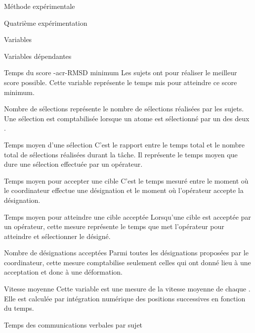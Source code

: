 \documentclass[myfrancais,ngerman,english,french]{mythesis}
\begin{document}
\begin{mychapter}{Méthode expérimentale}
\begin{mysection}{Quatrième expérimentation}
\begin{mysubsection}{Variables}
\begin{mysubsubsection}{Variables dépendantes}
\begin{myparagraph}{ Temps du score \myacronl-{acr-RMSD} minimum}
						Les sujets ont  pour réaliser le meilleur score  possible.
						Cette variable représente le temps mis pour atteindre ce score minimum.
					\end{myparagraph}
					\begin{myparagraph}{ Nombre de sélections}
						 représente le nombre de sélections réalisées par les sujets.
						Une sélection est comptabilisée lorsque un atome est sélectionné par un des deux .
					\end{myparagraph}
					\begin{myparagraph}{ Temps moyen d'une sélection}
						C'est le rapport entre le temps total et le nombre total de sélections réalisées durant la tâche.
						Il représente le temps moyen que dure une sélection effectuée par un opérateur.
					\end{myparagraph}
					\begin{myparagraph}{ Temps moyen pour accepter une cible}
						C'est le temps mesuré entre le moment où le coordinateur effectue une désignation et le moment où l'opérateur accepte la désignation.
					\end{myparagraph}
					\begin{myparagraph}{ Temps moyen pour atteindre une cible acceptée}
						Lorsqu'une cible est acceptée par un opérateur, cette mesure représente le temps que met l'opérateur pour atteindre et sélectionner le  désigné.
					\end{myparagraph}
					\begin{myparagraph}{ Nombre de désignations acceptées}
						Parmi toutes les désignations proposées par le coordinateur, cette mesure comptabilise seulement celles qui ont donné lieu à une acceptation et donc à une déformation.
					\end{myparagraph}
					\begin{myparagraph}{ Vitesse moyenne}
						Cette variable est une mesure de la vitesse moyenne de chaque .
						Elle est calculée par intégration numérique des positions successives en fonction du temps.
					\end{myparagraph}
					\begin{myparagraph}{ Temps des communications verbales par sujet}

\end{myparagraph}
\end{mysubsubsection}
\end{mysubsection}
\end{mysection}
\end{mychapter}
\end{document}
